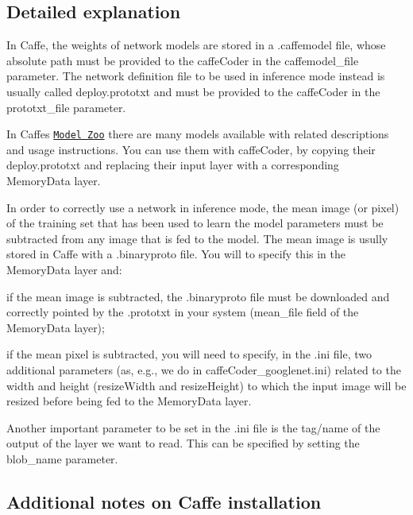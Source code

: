 \subsection*{Detailed explanation}

In Caffe, the weights of network models are stored in a {\ttfamily .caffemodel} file, whose absolute path must be provided to the {\ttfamily caffe\+Coder} in the {\ttfamily caffemodel\+\_\+file} parameter. The network definition file to be used in inference mode instead is usually called {\ttfamily deploy.\+prototxt} and must be provided to the {\ttfamily caffe\+Coder} in the {\ttfamily prototxt\+\_\+file} parameter.

In Caffe\textquotesingle{}s \href{http://caffe.berkeleyvision.org/model_zoo.html}{\tt Model Zoo} there are many models available with related descriptions and usage instructions. You can use them with {\ttfamily caffe\+Coder}, by copying their {\ttfamily deploy.\+prototxt} and replacing their input layer with a corresponding {\ttfamily Memory\+Data} layer.

In order to correctly use a network in inference mode, the mean image (or pixel) of the training set that has been used to learn the model parameters must be subtracted from any image that is fed to the model. The mean image is usully stored in Caffe with a {\ttfamily .binaryproto} file. You will to specify this in the {\ttfamily Memory\+Data} layer and\+:


\begin{DoxyItemize}
\item if the mean image is subtracted, the {\ttfamily .binaryproto} file must be downloaded and correctly pointed by the {\ttfamily .prototxt} in your system ({\ttfamily mean\+\_\+file} field of the {\ttfamily Memory\+Data} layer);
\item if the mean pixel is subtracted, you will need to specify, in the {\ttfamily .ini} file, two additional parameters (as, e.\+g., we do in {\ttfamily caffe\+Coder\+\_\+googlenet.\+ini}) related to the width and height ({\ttfamily resize\+Width} and {\ttfamily resize\+Height}) to which the input image will be resized before being fed to the {\ttfamily Memory\+Data} layer.
\end{DoxyItemize}

Another important parameter to be set in the {\ttfamily .ini} file is the tag/name of the output of the layer we want to read. This can be specified by setting the {\ttfamily blob\+\_\+name} parameter.

\subsection*{Additional notes on Caffe installation}

